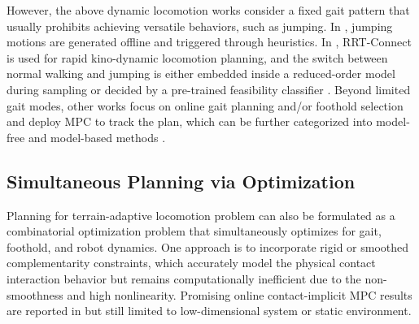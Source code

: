 However, the above dynamic locomotion works consider a fixed gait pattern that usually prohibits achieving versatile behaviors, such as jumping.
In \citep{Park2015OnlinePF, kim2020vision,gilroy2021autonomous}, jumping motions are generated offline and triggered through heuristics.
In \citep{fernbach2017kinodynamic,norby2020fast,chignoli2022rapid}, RRT-Connect is used for rapid kino-dynamic locomotion planning, and the switch between normal walking and jumping is either embedded inside a reduced-order model during sampling \citep{norby2020fast} or decided by a pre-trained feasibility classifier \citep{chignoli2022rapid}.
Beyond limited gait modes, other works focus on online gait planning and/or foothold selection and deploy MPC to track the plan,
which can be further categorized into model-free \citep{da2021learning,yang2022fast,xie2022glide,pmlr-v164-margolis22a,yu2024learning} and model-based methods \citep{boussema2019online,wang2023and,sun2023free}.


\subsection{Simultaneous Planning via Optimization}
Planning for terrain-adaptive locomotion problem can also be formulated as a combinatorial optimization problem that simultaneously optimizes for gait, foothold, and robot dynamics.
One approach is to incorporate rigid \citep{posa2014direct} or smoothed \citep{mordatch2012discovery, drnach2021robust} complementarity constraints, which accurately model the physical contact interaction behavior but remains computationally inefficient due to the non-smoothness and high nonlinearity. Promising online contact-implicit MPC results are reported in \citep{aydinoglu2022real,le2024fast, drnach2022mediating} but still limited to low-dimensional system or static environment. 

